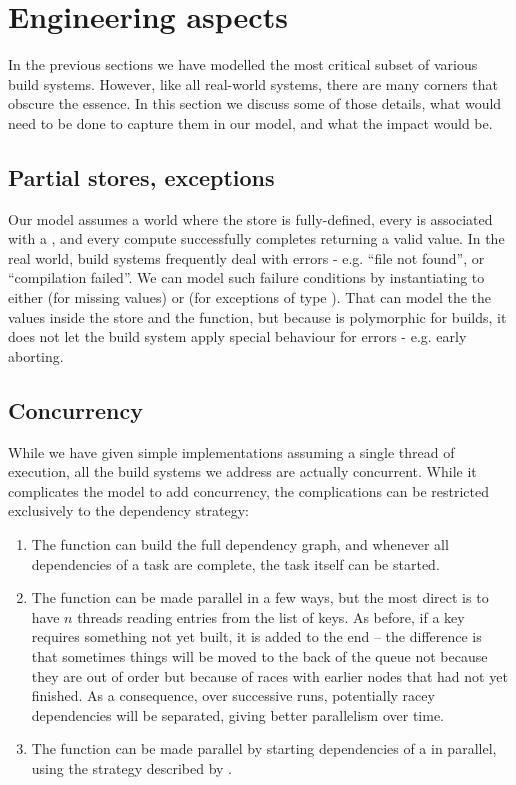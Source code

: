 \section{Engineering aspects}\label{sec-engineering}

In the previous sections we have modelled the most critical subset of various build systems. However, like all real-world systems, there are many corners that obscure the essence. In this section we discuss some of those details, what would need to be done to capture them in our model, and what the impact would be.

\subsection{Partial stores, exceptions}

Our model assumes a world where the store is fully-defined, every  is associated with a , and every compute successfully completes returning a valid value. In the real world, build systems frequently deal with errors - e.g. ``file not found'', or ``compilation failed''. We can model such failure conditions by instantiating  to either  (for missing values) or  (for exceptions of type ). That can model the the values inside the store and the  function, but because  is polymorphic for builds, it does not let the build system apply special behaviour for errors - e.g. early aborting.

\subsection{Concurrency}\label{sec-concurrency}

While we have given simple implementations assuming a single thread of execution, all the build systems we address are actually concurrent. While it complicates the model to add concurrency, the complications can be restricted exclusively to the dependency strategy:

\begin{enumerate}
\item The  function can build the full dependency graph, and whenever all dependencies of a task are complete, the task itself can be started.
\item The  function can be made parallel in a few ways, but the most direct is to have $n$ threads reading entries from the list of keys. As before, if a key requires something not yet built, it is added to the end -- the difference is that sometimes things will be moved to the back of the queue not because they are out of order but because of races with earlier nodes that had not yet finished. As a consequence, over successive runs, potentially racey dependencies will be separated, giving better parallelism over time.
\item The  function can be made parallel by starting  dependencies of a  in parallel, using the strategy described by \citet{haxl}.
\end{enumerate}

